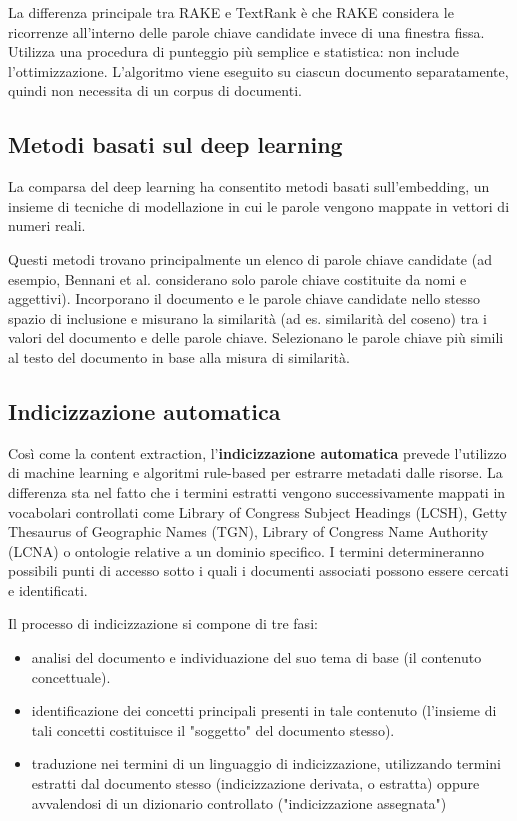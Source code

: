 La differenza principale tra RAKE e TextRank è che RAKE considera le ricorrenze all'interno delle parole chiave candidate invece di una finestra fissa. Utilizza una procedura di punteggio più semplice e statistica: non include l'ottimizzazione. L'algoritmo viene eseguito su ciascun documento separatamente, quindi non necessita di un corpus di documenti.

\subsection{Metodi basati sul deep learning}
La comparsa del deep learning ha consentito metodi basati sull'embedding, un insieme di tecniche di modellazione in cui le parole vengono mappate in vettori di numeri reali. 

Questi metodi trovano principalmente un elenco di parole chiave candidate (ad esempio, Bennani et al. considerano solo parole chiave costituite da nomi e aggettivi). Incorporano il documento e le parole chiave candidate nello stesso spazio di inclusione e misurano la similarità (ad es. similarità del coseno) tra i valori del documento e delle parole chiave. Selezionano le parole chiave più simili al testo del documento in base alla misura di similarità.

\subsection{Indicizzazione automatica}
Così come la content extraction, l'\textbf{indicizzazione automatica} prevede l'utilizzo di machine learning e algoritmi rule-based per estrarre metadati dalle risorse. La differenza sta nel fatto che i termini estratti vengono successivamente mappati in vocabolari controllati come Library of Congress Subject Headings (LCSH), Getty Thesaurus of Geographic Names (TGN), Library of Congress Name Authority (LCNA) o ontologie relative a un dominio specifico. I termini determineranno possibili punti di accesso sotto i quali i documenti associati possono essere cercati e identificati.

Il processo di indicizzazione si compone di tre fasi:
\begin{itemize}
\item analisi del documento e individuazione del suo tema di base (il contenuto concettuale).
\item identificazione dei concetti principali presenti in tale contenuto (l'insieme di tali concetti costituisce il "soggetto" del documento stesso).
\item traduzione nei termini di un linguaggio di indicizzazione, utilizzando termini estratti dal documento stesso (indicizzazione derivata, o estratta) oppure avvalendosi di un dizionario controllato ("indicizzazione assegnata")
\end{itemize}

